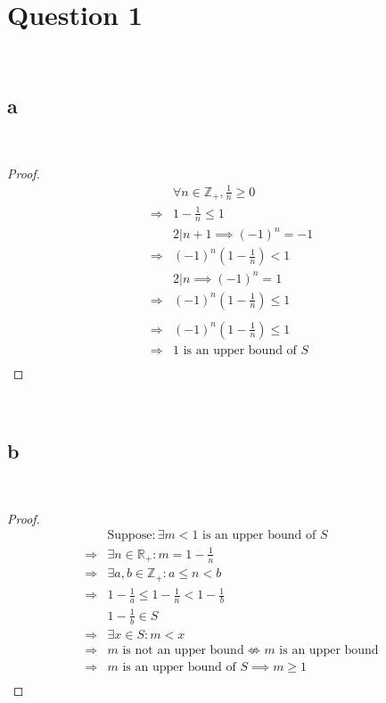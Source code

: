 \documentclass{article}
\begin{document}
\section*{Question 1}

~

\subsection*{a}

~

\begin{proof}
    \begin{align*}
        &\forall n\in \mathbb{Z} _+, \frac{1}{n}\geqslant0\\
        \Rightarrow&1-\frac{1}{n}\leqslant1\\
        &2|n+1\implies (-1)^n=-1\\
        \Rightarrow&(-1)^n(1-\frac{1}{n})<1\\
        &2|n\implies  (-1)^n=1\\
        \Rightarrow&(-1)^n(1-\frac{1}{n})\leqslant 1\\
        &\\
        \Rightarrow&(-1)^n(1-\frac{1}{n})\leqslant 1\\
        \Rightarrow&1\text{ is an upper bound of }S\\
    \end{align*}
\end{proof}

~

\subsection*{b}

~

\begin{proof}
    \begin{align*}
        &\text{Suppose}:\exists m<1\text{ is an upper bound of }S\\
        \Rightarrow&\exists n\in \mathbb{R} _+:m= 1-\frac{1}{n}\\
        \Rightarrow&\exists a,b\in\mathbb{Z} _+:a\leqslant n< b\\
        \Rightarrow&1-\frac{1}{a}\leqslant 1-\frac{1}{n}< 1-\frac{1}{b}\\
        &1-\frac{1}{b}\in S\\
        \Rightarrow&\exists x\in S:m< x\\
        \Rightarrow&m\text{ is not an upper bound}\nLeftrightarrow m\text{ is an upper bound}\\
        \Rightarrow&m\text{ is an upper bound of }S\implies m\geqslant 1\\
    \end{align*}
\end{proof}
\end{document}
